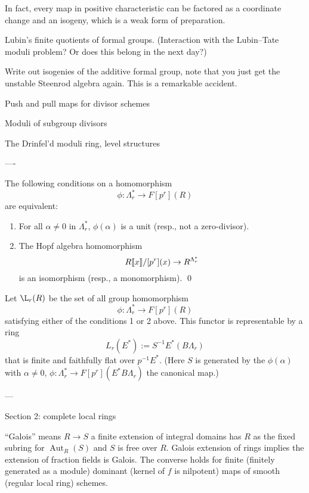 In fact, every map in positive characteristic can be factored as a coordinate change and an isogeny, which is a weak form of preparation.


Lubin's finite quotients of formal groups. (Interaction with the Lubin--Tate moduli problem?  Or does this belong in the next day?)


Write out isogenies of the additive formal group, note that you just get the unstable Steenrod algebra again.  This is a remarkable accident.


Push and pull maps for divisor schemes


Moduli of subgroup divisors


The Drinfel'd moduli ring, level structures

----

\begin{lemma}
The following conditions on a homomorphism \[\phi: \Lambda_r^* \to F[p^r](R)\] are equivalent:
\begin{enumerate}
\item For all $\alpha \ne 0$ in $\Lambda_r^*$, $\phi(\alpha)$ is a unit (resp., not a zero-divisor).
\item The Hopf algebra homomorphism \[R\llbracket{x}\rrbracket / [p^r](x) \to R^{\Lambda_r^*}\] is an isomorphism (resp., a monomorphism). \qed
\end{enumerate}
\end{lemma}

\begin{lemma}
Let $\L_r(R)$ be the set of all group homomorphism \[\phi: \Lambda_r^* \to F[p^r](R)\] satisfying either of the conditions 1 or 2 above.  This functor is representable by a ring \[L_r(E^*) := S^{-1} E^*(B\Lambda_r)\] that is finite and faithfully flat over $p^{-1} E^*$.  (Here $S$ is generated by the $\phi(\alpha)$ with $\alpha \ne 0$, $\phi: \Lambda_r^* \to F[p^r](E^* B\Lambda_r)$ the canonical map.)
\end{lemma}

---

Section 2: complete local rings

``Galois'' means $R \to S$ a finite extension of integral domains has $R$ as the fixed subring for $\operatorname{Aut}_R(S)$ and $S$ is free over $R$.  Galois extension of rings implies the extension of fraction fields is Galois.  The converse holds for finite (finitely generated as a module) dominant (kernel of $f$ is nilpotent) maps of smooth (regular local ring) schemes.

